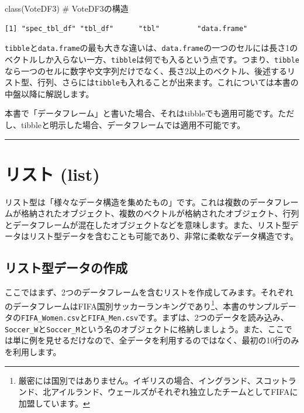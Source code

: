 \documentclass[
  a4paper,
  pandoc,
  ja=standard,
  jafont=haranoaji]{bxjsbook}
\newenvironment{Shaded}{\begin{snugshade}}{\end{snugshade}}
\newcommand{\CommentTok}[1]{\textcolor[rgb]{0.37,0.37,0.37}{#1}}
\newcommand{\FunctionTok}[1]{\textcolor[rgb]{0.28,0.35,0.67}{#1}}
\newcommand{\NormalTok}[1]{\textcolor[rgb]{0.00,0.48,0.65}{#1}}
\begin{document}
\begin{Shaded}
\begin{Highlighting}[numbers=left,,]
\FunctionTok{class}\NormalTok{(VoteDF3) }\CommentTok{\# VoteDF3の構造}
\end{Highlighting}
\end{Shaded}

\begin{verbatim}
[1] "spec_tbl_df" "tbl_df"      "tbl"         "data.frame" 
\end{verbatim}

\texttt{tibble}と\texttt{data.frame}の最も大きな違いは、\texttt{data.frame}の一つのセルには長さ1のベクトルしか入らない一方、\texttt{tibble}は何でも入るという点です。つまり、\texttt{tibble}なら一つのセルに数字や文字列だけでなく、長さ2以上のベクトル、後述するリスト型、行列、さらには\texttt{tibble}も入れることが出来ます。これについては本書の中盤以降に解説します。

本書で「データフレーム」と書いた場合、それはtibbleでも適用可能です。ただし、tibbleと明示した場合、データフレームでは適用不可能です。

\begin{center}\rule{0.5\linewidth}{0.5pt}\end{center}

\hypertarget{sec-datastructure_list}{%
\section{リスト (list)}\label{sec-datastructure_list}}

リスト型は「様々なデータ構造を集めたもの」です。これは複数のデータフレームが格納されたオブジェクト、複数のベクトルが格納されたオブジェクト、行列とデータフレームが混在したオブジェクトなどを意味します。また、リスト型データはリスト型データを含むことも可能であり、非常に柔軟なデータ構造です。

\hypertarget{ux30eaux30b9ux30c8ux578bux30c7ux30fcux30bfux306eux4f5cux6210}{%
\subsection{リスト型データの作成}\label{ux30eaux30b9ux30c8ux578bux30c7ux30fcux30bfux306eux4f5cux6210}}

ここではまず、2つのデータフレームを含むリストを作成してみます。それぞれのデータフレームはFIFA国別サッカーランキングであり\footnote{厳密には国別ではありません。イギリスの場合、イングランド、スコットランド、北アイルランド、ウェールズがそれぞれ独立したチームとしてFIFAに加盟しています。}、本書のサンプルデータの\texttt{FIFA\_Women.csv}と\texttt{FIFA\_Men.csv}です。まずは、2つのデータを読み込み、\texttt{Soccer\_W}と\texttt{Soccer\_M}という名のオブジェクトに格納しましょう。また、ここでは単に例を見せるだけなので、全データを利用するのではなく、最初の10行のみを利用します。
\end{document}
